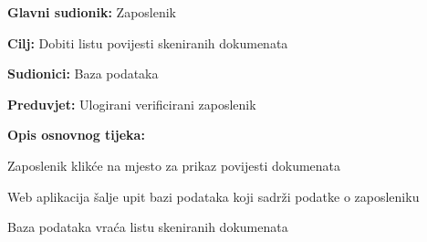 					\noindent {}
					\begin{packed_item}
						
						\item \textbf{Glavni sudionik:} Zaposlenik
						\item  \textbf{Cilj:} Dobiti listu povijesti skeniranih dokumenata
						\item  \textbf{Sudionici:} Baza podataka
						\item  \textbf{Preduvjet:} Ulogirani verificirani zaposlenik
						\item  \textbf{Opis osnovnog tijeka:}
						
						\item[] \begin{packed_enum}
							
							\item Zaposlenik klikće na mjesto za prikaz povijesti dokumenata
							\item Web aplikacija šalje upit bazi podataka koji sadrži podatke o zaposleniku
							\item Baza podataka vraća listu skeniranih dokumenata
							
						\end{packed_enum}
						
					\end{packed_item}
				\pagebreak
				\noindent {}
